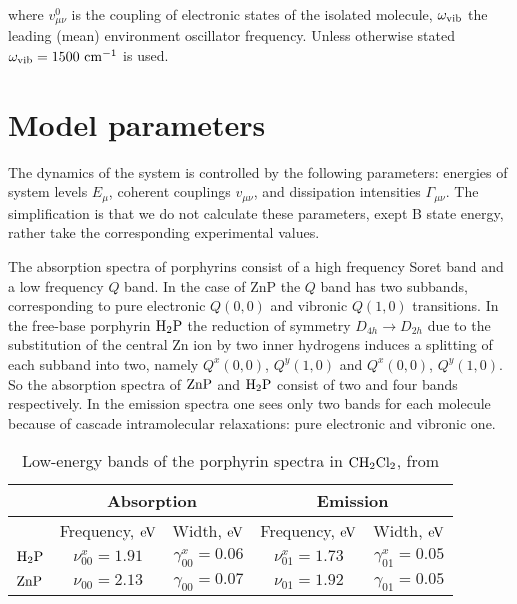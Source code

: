 \documentclass[12pt,twoside,a4paper]{report}
\begin{document}
where $v^0_{\mu\nu}$ is the coupling of  electronic states of the isolated
molecule,
$\omega_{\rm vib}$ the leading (mean) environment oscillator frequency.  
Unless otherwise stated $\omega_{\rm vib}=1500~{\rm cm}^{-1}$ is used.


\section{Model parameters}\label{chem-parameters}
The dynamics of the system is controlled by the following
parameters: energies of system levels $E_{\mu}$, coherent couplings
$v_{\mu{}\nu}$, and dissipation intensities $\Gamma_{\mu{}\nu}$. 
The
simplification is that we do not calculate these parameters, exept B state energy, rather
take the corresponding experimental values.


The absorption spectra of porphyrins \cite{r4} consist of a high frequency 
Soret band and a low frequency $Q$ band. In the case of ZnP the $Q$ band 
has two subbands, 
corresponding to pure electronic
$Q(0,0)$ and vibronic $Q(1,0)$ transitions. 
In the free-base porphyrin ${\rm H_2P}$ 
the reduction of symmetry $D_{4h} \to D_{2h}$ 
due to the 
substitution of the central Zn ion by two inner hydrogens
induces a splitting of each subband 
into two, namely $Q^x(0,0)$, $Q^y(1,0)$ and $Q^x(0,0)$, $Q^y(1,0)$. 
So the  absorption spectra of ${\rm ZnP}$ and ${\rm H_2P}$ 
consist of two and four bands 
respectively. In the emission spectra one sees only 
two bands for each molecule because of cascade intramolecular relaxations:
pure electronic and vibronic one. 
 


\footnotesize\begin{table}[ht] 
  \begin{center} 
    \caption[Low-energy bands of the porphyrin spectra]
    {\small Low-energy bands of the porphyrin spectra in ${\rm CH_2Cl_2}$, from \protect \cite{r16}} 
    \label{tab:1} 
      \begin{tabular}{ccccc} \small 
        & \multicolumn{2}{c}{Absorption} &
        \multicolumn{2}{c}{Emission} \\ \hline 
        & Frequency, $ {\rm eV}$ & Width,
        $ {\rm eV}$ & Frequency, $ {\rm eV}$ & Width, $ {\rm eV}$ \\ \hline 
        ${\rm H_2P}$ & $\nu
        _{00}^x=1.91$ & $\gamma _{00}^x=0.06$ & $\nu _{01}^x=1.73$ &
        $\gamma _{01}^x=0.05$ \\ 
        ${\rm ZnP}$ & $\nu _{00}=2.13$ & $\gamma
        _{00}=0.07$ & $\nu _{01}=1.92$ & $\gamma _{01}=0.05$ \\ 
    \end{tabular} 
  \end{center} 
\end{table} 
\normalsize
\end{document}
